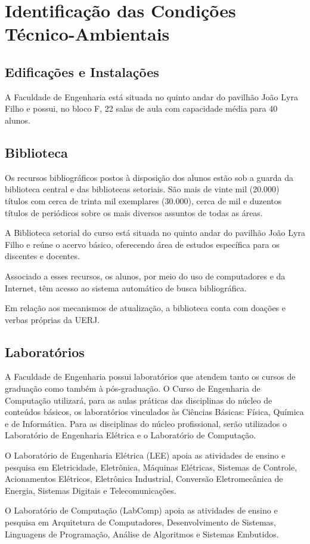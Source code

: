 \section{Identificação das Condições Técnico-Ambientais}

\subsection{Edificações e Instalações}
A Faculdade de Engenharia está situada no quinto andar do pavilhão João Lyra Filho e possui, no bloco F, 22 salas de aula com capacidade média para 40 alunos.

\subsection{Biblioteca}
Os recursos bibliográficos postos à disposição dos alunos estão sob a guarda da biblioteca central e das bibliotecas setoriais. São mais de vinte mil (20.000) títulos com cerca de trinta mil exemplares (30.000), cerca de mil e duzentos títulos de periódicos sobre os mais diversos assuntos de todas as áreas.

A Biblioteca setorial do curso está situada no quinto andar do pavilhão João Lyra Filho e reúne o acervo básico, oferecendo área de estudos específica para os discentes e docentes.

Associado a esses recursos, os alunos, por meio do uso de computadores e da Internet, têm acesso ao sistema automático de busca bibliográfica.

Em relação aos mecanismos de atualização, a biblioteca conta com doações e verbas próprias da UERJ.

\subsection{Laboratórios}
A Faculdade de Engenharia possui laboratórios que atendem tanto os cursos de graduação como também à pós-graduação. O Curso de Engenharia de Computação utilizará, para as aulas práticas das disciplinas do núcleo de conteúdos básicos, os laboratórios vinculados às Ciências Básicas: Física, Química e de Informática. Para as disciplinas do núcleo profissional, serão utilizados o Laboratório de Engenharia Elétrica e o Laboratório de Computação.

O Laboratório de Engenharia Elétrica (LEE) apoia as atividades de ensino e pesquisa em Eletricidade, Eletrônica, Máquinas Elétricas, Sistemas de Controle, Acionamentos Elétricos, Eletrônica Industrial, Conversão Eletromecânica de Energia, Sistemas Digitais e Telecomunicações.

O Laboratório de Computação (LabComp) apoia as atividades de ensino e pesquisa em Arquitetura de Computadores, Desenvolvimento de Sistemas, Linguagens de Programação, Análise de Algoritmos e Sistemas Embutidos.
